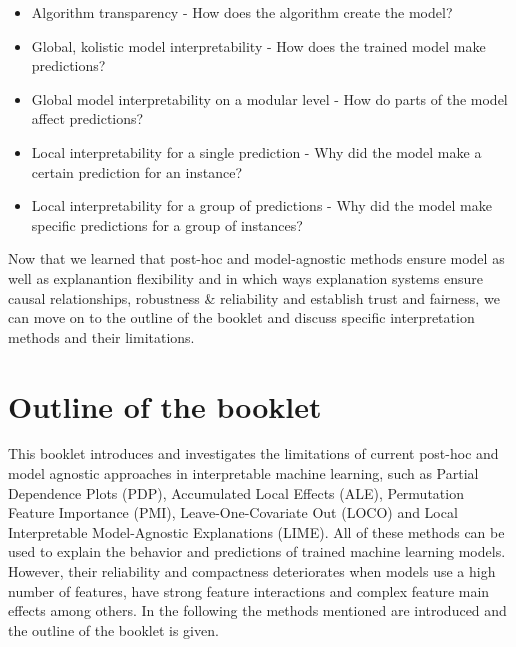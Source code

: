 \documentclass[
]{krantz}
\providecommand{\tightlist}{%
  \setlength{\itemsep}{0pt}\setlength{\parskip}{0pt}}
\begin{document}
\begin{itemize}
\tightlist
\item
  Algorithm transparency - How does the algorithm create the model?
\item
  Global, kolistic model interpretability - How does the trained model make predictions?
\item
  Global model interpretability on a modular level - How do parts of the model affect predictions?
\item
  Local interpretability for a single prediction - Why did the model make a certain prediction for an instance?
\item
  Local interpretability for a group of predictions - Why did the model make specific predictions for a group of instances?
\end{itemize}

Now that we learned that post-hoc and model-agnostic methods ensure model as well as explanantion flexibility and in which ways explanation systems ensure causal relationships, robustness \& reliability and establish trust and fairness, we can move on to the outline of the booklet and discuss specific interpretation methods and their limitations.

\hypertarget{outline-of-the-booklet}{%
\section{Outline of the booklet}\label{outline-of-the-booklet}}

This booklet introduces and investigates the limitations of current post-hoc and model agnostic approaches in interpretable machine learning, such as Partial Dependence Plots (PDP), Accumulated Local Effects (ALE), Permutation Feature Importance (PMI), Leave-One-Covariate Out (LOCO) and Local Interpretable Model-Agnostic Explanations (LIME). All of these methods can be used to explain the behavior and predictions of trained machine learning models. However, their reliability and compactness deteriorates when models use a high number of features, have strong feature interactions and complex feature main effects among others. In the following the methods mentioned are introduced and the outline of the booklet is given.
\end{document}
